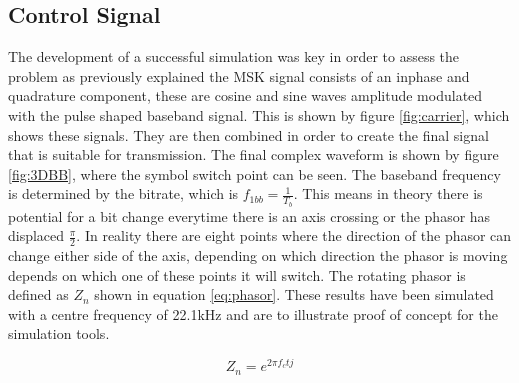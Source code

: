 \subsection{Control Signal}
The development of a successful simulation was key in order to assess the problem as previously explained the MSK signal consists of an inphase and quadrature component, these are cosine and sine waves amplitude modulated with the pulse shaped baseband signal. This is shown by figure \ref{fig:carrier}, which shows these signals. 
They are then combined in order to create the final signal that is suitable for transmission. The final complex waveform is shown by figure \ref{fig:3DBB}, where the symbol switch point can be seen. The baseband frequency is determined by the bitrate, which is $f_{1bb} = \frac{1}{T_b}$. This means in theory there is potential for a bit change everytime there is an axis crossing or the phasor has displaced $\frac{\pi}{2}$. In reality there are eight points where the direction of the phasor can change either side of the axis, depending on which direction the phasor is moving depends on which one of these points it will switch. The rotating phasor is defined as $Z_{n}$ shown in equation \ref{eq:phasor}. These results have been simulated with a centre frequency of 22.1kHz and are to illustrate proof of concept for the simulation tools.

\begin{equation}
    Z_n = e^{2\pi f_{c}tj}
    \label{eq:phasor}
\end{equation}

